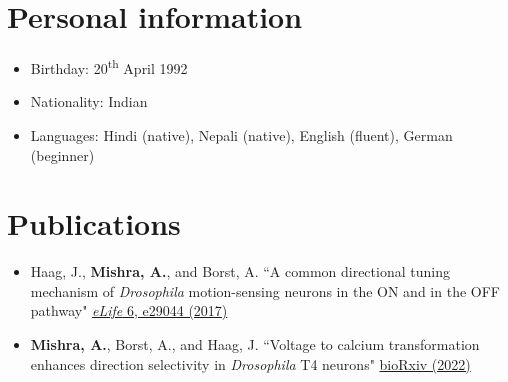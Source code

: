 \section*{Personal information}

\begin{itemize}
     \item Birthday: 20\textsuperscript{th} April 1992
     \item Nationality: Indian
     \item Languages: Hindi (native), Nepali (native), English (fluent), German (beginner)
\end{itemize}

\section*{Publications}

\begin{itemize}

    \item Haag, J., {\textbf{Mishra, A.}}, and Borst, A.  ``A common directional tuning mechanism of \textit{Drosophila} motion-sensing neurons in the ON and in the OFF pathway" \href{https://elifesciences.org/articles/29044}{\color{blue}\emph{eLife} 6, e29044 (2017)}
    \item {\textbf{Mishra, A.}}, Borst, A., and Haag, J. ``Voltage to calcium transformation enhances direction selectivity in \textit{Drosophila} T4 neurons" \href{https://www.biorxiv.org/content/10.1101/2022.07.01.498438v1}{\color{blue}bioRxiv (2022)}
        
    
\end{itemize}